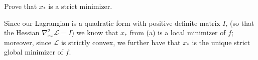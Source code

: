 Prove that $x_*$ is a strict minimizer.

\begin{solution}
    Since our Lagrangian is a quadratic form with positive definite matrix $I$, (so that the Hessian
    $\nabla^2_{xx} \mathcal{L} = I$) we know that $x_*$ from (a) is a local minimizer of $f$; moreover, since 
    $\mathcal{L}$ is strictly convex, we further have that $x_*$ is the unique strict global minimizer of $f$.
    \ \\
\end{solution}